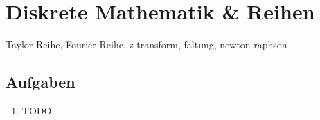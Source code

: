 \chapter{Diskrete Mathematik \& Reihen}

Taylor Reihe, Fourier Reihe, z transform, faltung, newton-raphson


\section{Aufgaben}
\begin{enumerate}
\item TODO
\end{enumerate}
